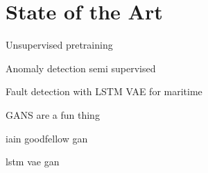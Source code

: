 \section{State of the Art}


Unsupervised pretraining \cite{alaaDeepLstm2019}

Anomaly detection semi supervised \cite{huang2021esad}

Fault detection with LSTM VAE for maritime \cite{9514856} 

GANS are a fun thing \cite{jiang2023unsupervised}

iain goodfellow gan \cite{goodfellow2016nips}

lstm vae gan \cite{s20133738}